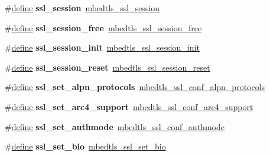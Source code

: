 \begin{DoxyCompactItemize}
\item 
\mbox{\label{compat-1_83_8h_a6d06ee7156fdb322e0007cea5076ec29}} 
\#\hyperlink{structdefine}{define} {\bfseries ssl\+\_\+session}~\hyperlink{structmbedtls__ssl__session}{mbedtls\+\_\+ssl\+\_\+session}
\item 
\mbox{\label{compat-1_83_8h_a7959be46be934268d75ba43e3a078358}} 
\#\hyperlink{structdefine}{define} {\bfseries ssl\+\_\+session\+\_\+free}~\hyperlink{ssl_8h_ac085defe1a02ab784a0a2fb201bcc741}{mbedtls\+\_\+ssl\+\_\+session\+\_\+free}
\item 
\mbox{\label{compat-1_83_8h_afbb81ad5bff5dddd5b425ef1c413cffe}} 
\#\hyperlink{structdefine}{define} {\bfseries ssl\+\_\+session\+\_\+init}~\hyperlink{ssl_8h_a7980469655c1cdb8fd7e966bffe1fd02}{mbedtls\+\_\+ssl\+\_\+session\+\_\+init}
\item 
\mbox{\label{compat-1_83_8h_a0ab6e103f66e7a214ece0263946b2f78}} 
\#\hyperlink{structdefine}{define} {\bfseries ssl\+\_\+session\+\_\+reset}~\hyperlink{ssl_8h_a21432367cbce428f10dcb62d9456fa7e}{mbedtls\+\_\+ssl\+\_\+session\+\_\+reset}
\item 
\mbox{\label{compat-1_83_8h_a92c5635bcf1df30e26610a0796e11646}} 
\#\hyperlink{structdefine}{define} {\bfseries ssl\+\_\+set\+\_\+alpn\+\_\+protocols}~\hyperlink{ssl_8h_ae21135dddd89b2ef273c13e140097f5a}{mbedtls\+\_\+ssl\+\_\+conf\+\_\+alpn\+\_\+protocols}
\item 
\mbox{\label{compat-1_83_8h_a7c0880ea2f97099eddea410c1822788a}} 
\#\hyperlink{structdefine}{define} {\bfseries ssl\+\_\+set\+\_\+arc4\+\_\+support}~\hyperlink{ssl_8h_a9e904913a122bd7cb13260217e4cc868}{mbedtls\+\_\+ssl\+\_\+conf\+\_\+arc4\+\_\+support}
\item 
\mbox{\label{compat-1_83_8h_ac5d2dc0295ad7809399cf70d134a8f9c}} 
\#\hyperlink{structdefine}{define} {\bfseries ssl\+\_\+set\+\_\+authmode}~\hyperlink{ssl_8h_a5695285c9dbfefec295012b566290f37}{mbedtls\+\_\+ssl\+\_\+conf\+\_\+authmode}
\item 
\mbox{\label{compat-1_83_8h_aeb06712ab77e205d6f91f102aee0a73b}} 
\#\hyperlink{structdefine}{define} {\bfseries ssl\+\_\+set\+\_\+bio}~\hyperlink{ssl_8h_a8b7442420aef7f1a76fa8c5336362f9e}{mbedtls\+\_\+ssl\+\_\+set\+\_\+bio}

\end{DoxyCompactItemize}
